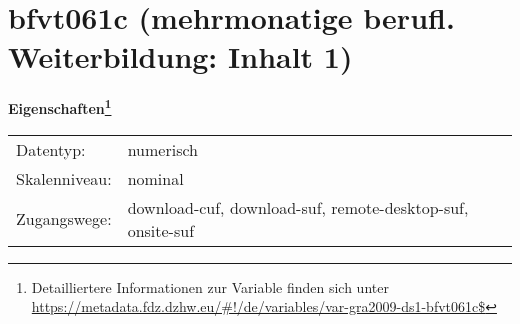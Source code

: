 
    \setcounter{footnote}{0}

    \vspace*{-1.8cm}
	\section{bfvt061c (mehrmonatige berufl. Weiterbildung: Inhalt 1)}
	\label{section:bfvt061c}



    \vspace*{0.5cm}
    \noindent\textbf{Eigenschaften\footnote{Detailliertere Informationen zur Variable finden sich unter
		\url{https://metadata.fdz.dzhw.eu/\#!/de/variables/var-gra2009-ds1-bfvt061c$}}}\\
	\begin{tabularx}{\hsize}{@{}lX}
	Datentyp: & numerisch \\
	Skalenniveau: & nominal \\
	Zugangswege: &
	  download-cuf, 
	  download-suf, 
	  remote-desktop-suf, 
	  onsite-suf
 \\
    \end{tabularx}



